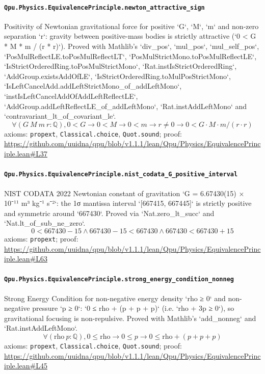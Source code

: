 \documentclass[11pt]{article}
\begin{document}
\paragraph{\texttt{Qpu.Physics.EquivalencePrinciple.newton\_attractive\_sign}}
Positivity of Newtonian gravitational force for positive `G`, `M`, `m` and non-zero separation `r`: gravity between positive-mass bodies is strictly attractive (`0 < G * M * m / (r * r)`). Proved with Mathlib's `div\_pos`, `mul\_pos`, `mul\_self\_pos`, `PosMulReflectLE.toPosMulReflectLT`, `PosMulStrictMono.toPosMulReflectLE`, `IsStrictOrderedRing.toPosMulStrictMono`, `Rat.instIsStrictOrderedRing`, `AddGroup.existsAddOfLE`, `IsStrictOrderedRing.toMulPosStrictMono`, `IsLeftCancelAdd.addLeftStrictMono\_of\_addLeftMono`, `instIsLeftCancelAddOfAddLeftReflectLE`, `AddGroup.addLeftReflectLE\_of\_addLeftMono`, `Rat.instAddLeftMono` and `contravariant\_lt\_of\_covariant\_le`.
\[ \forall (G\ M\ m\ r : \mathbb{Q}), 0 < G \to 0 < M \to 0 < m \to r \ne 0 \to 0 < G \cdot M \cdot m / (r \cdot r) \]
\noindent axioms: \texttt{propext}, \texttt{Classical.choice}, \texttt{Quot.sound}; proof: \url{https://github.com/uuidna/qpu/blob/v1.1.1/lean/Qpu/Physics/EquivalencePrinciple.lean\#L37}

\paragraph{\texttt{Qpu.Physics.EquivalencePrinciple.nist\_codata\_G\_positive\_interval}}
NIST CODATA 2022 Newtonian constant of gravitation `G = 6.67430(15) × 10⁻¹¹ m³ kg⁻¹ s⁻²`: the 1σ mantissa interval `[667415, 667445]` is strictly positive and symmetric around `667430`. Proved via `Nat.zero\_lt\_succ` and `Nat.lt\_of\_sub\_ne\_zero`.
\[ 0 < 667430 - 15 \land 667430 - 15 < 667430 \land 667430 < 667430 + 15 \]
\noindent axioms: \texttt{propext}; proof: \url{https://github.com/uuidna/qpu/blob/v1.1.1/lean/Qpu/Physics/EquivalencePrinciple.lean\#L63}

\paragraph{\texttt{Qpu.Physics.EquivalencePrinciple.strong\_energy\_condition\_nonneg}}
Strong Energy Condition for non-negative energy density `rho ≥ 0` and non-negative pressure `p ≥ 0`: `0 ≤ rho + (p + p + p)` (i.e. `rho + 3p ≥ 0`), so gravitational focusing is non-repulsive. Proved with Mathlib's `add\_nonneg` and `Rat.instAddLeftMono`.
\[ \forall (\mathrm{rho}\ p : \mathbb{Q}), 0 \le \mathrm{rho} \to 0 \le p \to 0 \le \mathrm{rho} + (p + p + p) \]
\noindent axioms: \texttt{propext}, \texttt{Classical.choice}, \texttt{Quot.sound}; proof: \url{https://github.com/uuidna/qpu/blob/v1.1.1/lean/Qpu/Physics/EquivalencePrinciple.lean\#L45}
\end{document}
